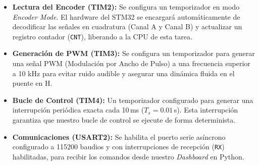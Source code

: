\documentclass[10pt,a4paper]{report}
\begin{document}
\begin{itemize}
	\item \textbf{Lectura del Encoder (TIM2):} Se configura un temporizador en modo \textit{Encoder Mode}. El hardware del STM32 se encargará automáticamente de decodificar las señales en cuadratura (Canal A y Canal B) y actualizar un registro contador (\texttt{CNT}), liberando a la CPU de esta tarea.
	\item \textbf{Generación de PWM (TIM3):} Se configura un temporizador para generar una señal PWM (Modulación por Ancho de Pulso) a una frecuencia superior a 10 kHz para evitar ruido audible y asegurar una dinámica fluida en el puente en H.
	\item \textbf{Bucle de Control (TIM4):} Un temporizador configurado para generar una interrupción periódica exacta cada 10\,ms ($T_s = 0.01\,$s). Esta interrupción garantiza que nuestro bucle de control se ejecute de forma determinista.
	\item \textbf{Comunicaciones (USART2):} Se habilita el puerto serie asíncrono configurado a 115200 baudios y con interrupciones de recepción (\texttt{RX}) habilitadas, para recibir los comandos desde nuestro \textit{Dashboard} en Python.
\end{itemize}

\end{document}
